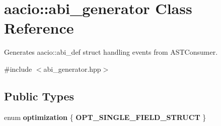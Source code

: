 \hypertarget{classaacio_1_1abi__generator}{}\section{aacio\+:\+:abi\+\_\+generator Class Reference}
\label{classaacio_1_1abi__generator}


Generates aacio\+::abi\+\_\+def struct handling events from A\+S\+T\+Consumer.  




{\ttfamily \#include $<$abi\+\_\+generator.\+hpp$>$}

\subsection*{Public Types}
\begin{DoxyCompactItemize}
\item 
\mbox{\label{classaacio_1_1abi__generator_af42071fc1f4deb0a064985cb7b087b36}} 
enum {\bfseries optimization} \{ {\bfseries O\+P\+T\+\_\+\+S\+I\+N\+G\+L\+E\+\_\+\+F\+I\+E\+L\+D\+\_\+\+S\+T\+R\+U\+CT}
 \}
\end{DoxyCompactItemize}
